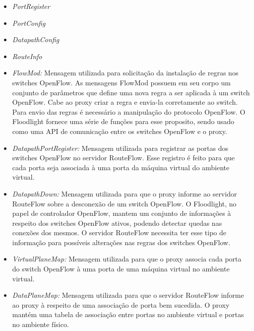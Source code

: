 \begin{itemize}
\item \textit{PortRegister}
\item \textit{PortConfig}
\item \textit{DatapathConfig}
\item \textit{RouteInfo}
\item \textit{FlowMod:} Mensagem utilizada para 
solicitação da instalação de regras nos switches 
OpenFlow. As mensagens FlowMod possuem em seu 
corpo um conjunto de parâmetros que define uma nova regra 
a ser aplicada à um switch OpenFlow. Cabe ao proxy 
criar a regra e envia-la corretamente ao switch. 
Para envio das regras é necessário a manipulação do 
protocolo OpenFlow. O Floodlight fornece uma série de 
funções para esse proposito, sendo usado como uma 
API de comunicação entre os switches OpenFlow e o 
proxy.
\item \textit{DatapathPortRegister:} Mensagem utilizada 
para registrar as portas dos switches OpenFlow 
no servidor RouteFlow. Esse registro é feito para que cada 
porta seja associada à uma porta da máquina 
virtual do ambiente virtual.
\item \textit{DatapathDown:} Mensagem utilizada para que 
o proxy informe ao servidor RouteFlow sobre a 
desconexão de um switch OpenFlow. O Floodlight, no papel 
de controlador OpenFlow, mantem um conjunto de 
informações à respeito dos switches OpenFlow ativos, 
podendo detectar quedas nas conexões dos mesmos. O 
servidor RouteFlow necessita ter esse tipo de informação para 
possíveis alterações nas regras dos 
switches OpenFlow.
\item \textit{VirtualPlaneMap:} Mensagem utilizada para que 
o proxy associa cada porta do switch 
OpenFlow à uma porta de uma máquina virtual no ambiente 
virtual.
\item \textit{DataPlaneMap:} Mensagem utilizada para que o 
servidor RouteFlow informe ao proxy à 
respeito de uma associação de porta bem sucedida. O proxy 
mantém uma tabela de associação entre portas 
no ambiente virtual e portas no ambiente físico.
\end{itemize}

